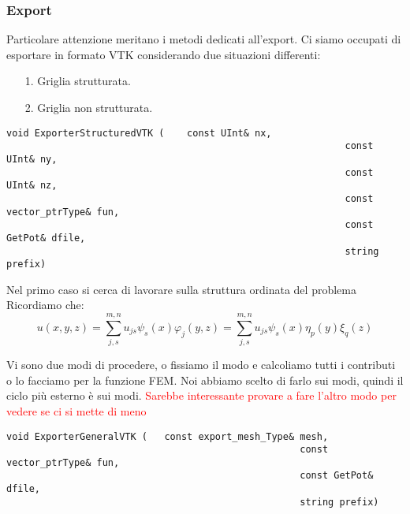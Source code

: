 \subsubsection{Export}

Particolare attenzione meritano i metodi dedicati all'export. Ci siamo occupati di esportare in formato VTK considerando due situazioni differenti:
\begin{itemize}
\item[1.] Griglia strutturata.
\item[2.] Griglia non strutturata.
\end{itemize}
\begin{lstlisting}[style = general]
void ExporterStructuredVTK (	const UInt& nx,
															const UInt& ny,
															const UInt& nz,
															const vector_ptrType& fun,
															const GetPot& dfile, 
															string prefix)
\end{lstlisting}
Nel primo caso si cerca di lavorare sulla struttura ordinata del problema
Ricordiamo che:
\begin{equation}
u(x,y,z) = \sum_{j,s}^{m,n}u_{js}\psi_s(x)\varphi_j(y,z) = \sum_{j,s}^{m,n}u_{js}\psi_s(x)\eta_p(y)\xi_q(z)
\end{equation}

Vi sono due modi di procedere, o fissiamo il modo e calcoliamo tutti i contributi o lo facciamo per la funzione FEM.
Noi abbiamo scelto di farlo sui modi, quindi il ciclo pi\`u esterno \`e sui modi.
\textcolor{red}{Sarebbe interessante provare a fare l'altro modo per vedere se ci si mette di meno}

\begin{lstlisting}[style = general]
void ExporterGeneralVTK (	const export_mesh_Type& mesh,
													const vector_ptrType& fun,
													const GetPot& dfile,
													string prefix)
\end{lstlisting}


